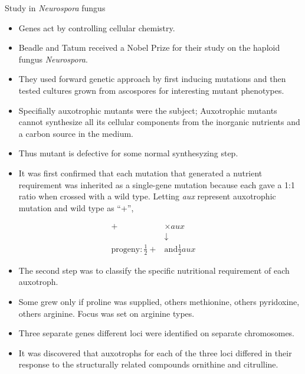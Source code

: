 \documentclass[11pt,dvipsnames,ignorenonframetext,aspectratio=169]{beamer}
\providecommand{\tightlist}{%
  \setlength{\itemsep}{0pt}\setlength{\parskip}{0pt}}
\begin{document}
\begin{frame}{Study in \emph{Neurospora} fungus}
\protect\hypertarget{study-in-neurospora-fungus}{}
\begin{itemize}
\tightlist
\item
  Genes act by controlling cellular chemistry.
\item
  Beadle and Tatum received a Nobel Prize for their study on the haploid
  fungus \emph{Neurospora}.
\item
  They used forward genetic approach by first inducing mutations and
  then tested cultures grown from ascospores for interesting mutant
  phenotypes.
\item
  Specifially auxotrophic mutants were the subject; Auxotrophic mutants
  cannot synthesize all its cellular components from the inorganic
  nutrients and a carbon source in the medium.
\item
  Thus mutant is defective for some normal synthesyzing step.
\end{itemize}
\end{frame}

\begin{frame}{}
\protect\hypertarget{section-8}{}
\begin{itemize}
\tightlist
\item
  It was first confirmed that each mutation that generated a nutrient
  requirement was inherited as a single-gene mutation because each gave
  a 1:1 ratio when crossed with a wild type. Letting \emph{aux}
  represent auxotrophic mutation and wild type as ``+'',
\end{itemize}

\[
\begin{aligned}
+ &\times aux \\
 &\downarrow\\
\textrm{progeny}: \frac{1}{2} + &\textrm{and} \frac{1}{2}aux
\end{aligned}
\]

\begin{itemize}
\tightlist
\item
  The second step was to classify the specific nutritional requirement
  of each auxotroph.
\item
  Some grew only if proline was supplied, others methionine, others
  pyridoxine, others arginine. Focus was set on arginine types.
\item
  Three separate genes different loci were identified on separate
  chromosomes.
\item
  It was discovered that auxotrophs for each of the three loci differed
  in their response to the structurally related compounds ornithine and
  citrulline.
\end{itemize}
\end{frame}
\end{document}
